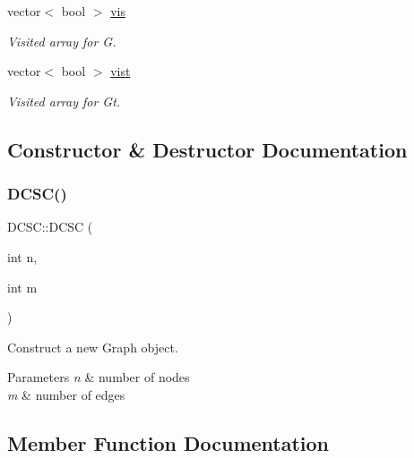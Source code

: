 \begin{DoxyCompactItemize}
vector$<$ bool $>$ \mbox{\hyperlink{classDCSC_a5bdcee3f90e24a2742b10be94dc42502}{vis}}
\begin{DoxyCompactList}\small\item\em Visited array for G. \end{DoxyCompactList}\item 
\mbox{\label{classDCSC_a95855fd264265a73a7bbe51452558dd0}} 
vector$<$ bool $>$ \mbox{\hyperlink{classDCSC_a95855fd264265a73a7bbe51452558dd0}{vist}}
\begin{DoxyCompactList}\small\item\em Visited array for Gt. \end{DoxyCompactList}\end{DoxyCompactItemize}


\subsection{Constructor \& Destructor Documentation}
\mbox{\label{classDCSC_a9d23a63eca7b3007daa3e1c6f6a61f2c}} 
\subsubsection{\texorpdfstring{D\+C\+S\+C()}{DCSC()}}
{\footnotesize\ttfamily D\+C\+S\+C\+::\+D\+C\+SC (\begin{DoxyParamCaption}\item[{int}]{n,  }\item[{int}]{m }\end{DoxyParamCaption})}



Construct a new Graph object. 


\begin{DoxyParams}{Parameters}
{\em n} & number of nodes \\
\hline
{\em m} & number of edges \\
\hline
\end{DoxyParams}


\subsection{Member Function Documentation}
\mbox{\label{classDCSC_ac971c9c7f4b35eebaab12f9dc399e260}} 
